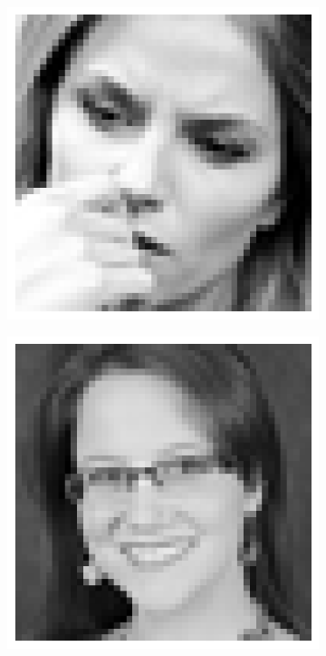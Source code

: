 \documentclass{article}
\begin{document}
\begin{figure}
\begin{subfigure}{0.1\textwidth}
  \end{subfigure}
  \begin{subfigure}{0.1\textwidth}
    \centering
    \includegraphics[width=\textwidth]{"fear"}
  \end{subfigure}
  \begin{subfigure}{0.1\textwidth}
    \centering
    \includegraphics[width=\textwidth]{"happy"}

\end{subfigure}
\end{figure}
\end{document}
